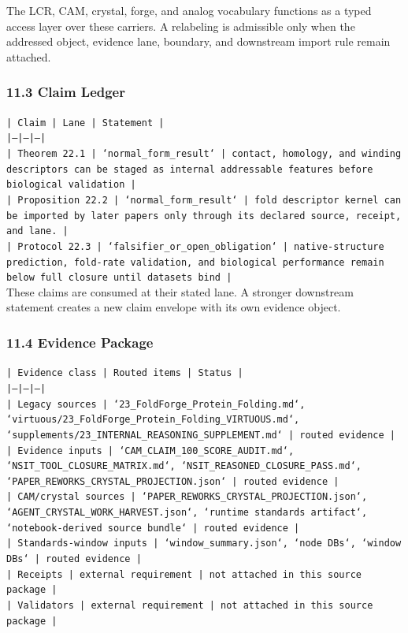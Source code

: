\documentclass[11pt]{article}
\begin{document}
The LCR, CAM, crystal, forge, and analog vocabulary functions as a typed access
layer over these carriers. A relabeling is admissible only when the addressed
object, evidence lane, boundary, and downstream import rule remain attached.

\subsubsection*{11.3 Claim Ledger}

\noindent\texttt{| Claim | Lane | Statement |}\\
\noindent\texttt{|---|---|---|}\\
\noindent\texttt{| Theorem 22.1 | `normal\_form\_result` | contact, homology, and winding descriptors can be staged as internal addressable features before biological validation |}\\
\noindent\texttt{| Proposition 22.2 | `normal\_form\_result` | fold descriptor kernel can be imported by later papers only through its declared source, receipt, and lane. |}\\
\noindent\texttt{| Protocol 22.3 | `falsifier\_or\_open\_obligation` | native-structure prediction, fold-rate validation, and biological performance remain below full closure until datasets bind |}\\

These claims are consumed at their stated lane. A stronger downstream statement
creates a new claim envelope with its own evidence object.

\subsubsection*{11.4 Evidence Package}

\noindent\texttt{| Evidence class | Routed items | Status |}\\
\noindent\texttt{|---|---|---|}\\
\noindent\texttt{| Legacy sources | `23\_FoldForge\_Protein\_Folding.md`, `virtuous/23\_FoldForge\_Protein\_Folding\_VIRTUOUS.md`, `supplements/23\_INTERNAL\_REASONING\_SUPPLEMENT.md` | routed evidence |}\\
\noindent\texttt{| Evidence inputs | `CAM\_CLAIM\_100\_SCORE\_AUDIT.md`, `NSIT\_TOOL\_CLOSURE\_MATRIX.md`, `NSIT\_REASONED\_CLOSURE\_PASS.md`, `PAPER\_REWORKS\_CRYSTAL\_PROJECTION.json` | routed evidence |}\\
\noindent\texttt{| CAM/crystal sources | `PAPER\_REWORKS\_CRYSTAL\_PROJECTION.json`, `AGENT\_CRYSTAL\_WORK\_HARVEST.json`, `runtime standards artifact`, `notebook-derived source bundle` | routed evidence |}\\
\noindent\texttt{| Standards-window inputs | `window\_summary.json`, `node DBs`, `window DBs` | routed evidence |}\\
\noindent\texttt{| Receipts | external requirement | not attached in this source package |}\\
\noindent\texttt{| Validators | external requirement | not attached in this source package |}\\
\end{document}

